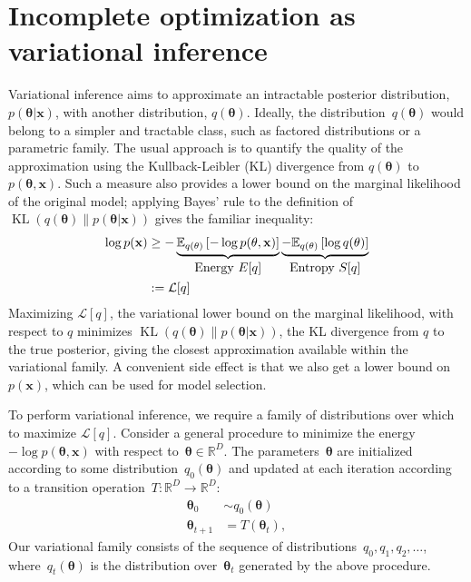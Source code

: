 \documentclass[]{article}
\newcommand{\vx}{\mathbf{x}}
\newcommand{\expectargs}[2]{\mathbb{E}_{#1} \left[ {#2} \right]}
\newcommand{\varL}{\mathcal{L}}
\DeclareMathOperator{\KLop}{KL}
\newcommand{\KL}[2]{\KLop \left(#1 \middle \| #2 \right)}
\newcommand{\data}{\vx}
\newcommand{\params}{\mathbf{\theta}}
\newcommand{\trans}{T}
\newcommand{\jointdist}{p(\params , \data)}
\newcommand{\posterior}{p(\params | \data)}
\newcommand{\reals}{\mathbb{R}}
\begin{document}
\section{Incomplete optimization as variational inference}
\label{sec:techintro}
Variational inference \citep{wainwright2008graphical}  aims to approximate an intractable posterior distribution, $\posterior$, with another distribution, $q(\params)$.
Ideally, the distribution~$q(\params)$ would belong to a simpler and tractable class, such as factored distributions or a parametric family.
The usual approach is to quantify the quality of the approximation using the Kullback-Leibler (KL) divergence from $q(\params)$ to $\jointdist$.
Such a measure also provides a lower bound on the marginal likelihood of the original model;
applying Bayes' rule to the definition of $\KL{q(\params)}{\posterior}$ gives the familiar inequality:
%
\begin{align}
\log p(\data)
& \geq - \underbrace{\expectargs{q(\params)}{ -\log \jointdist }}_{\textnormal{\normalsize Energy $E[q]$}}
         \underbrace{- \expectargs{q(\params)}{\log  q(\params)}}_{\textnormal{\normalsize Entropy $S[q]$}} \nonumber \\
& := \varL[q] \label{eq:varbound}
\end{align}
%
Maximizing $\varL[q]$, the variational lower bound on the marginal likelihood, with respect to $q$ minimizes $\KL{q(\params)}{\posterior}$, the KL divergence from $q$ to the true posterior, giving the closest approximation available within the variational family.
A convenient side effect is that we also get a lower bound on $p(\data)$, which can be used for model selection.

To perform variational inference, we require a family of distributions over which to maximize $\varL[q]$. 
Consider a general procedure to minimize the energy~$-\log\jointdist$ with respect to~${\params \in \reals^D}$.
The parameters~$\params$ are initialized according to some distribution~$q_0(\params)$ and updated at each iteration according to a transition operation~${\trans : \reals^D \rightarrow \reals^D}$:
%
\begin{align}
\params_0 &\sim q_0(\params) \nonumber \\
\params_{t + 1} &= \trans(\params_t), \nonumber
\end{align}
%
Our variational family consists of the sequence of distributions~$q_0, q_1, q_2, \ldots$,
where~$q_t(\params)$ is the distribution over~$\params_t$ generated by the above procedure.
\end{document}
